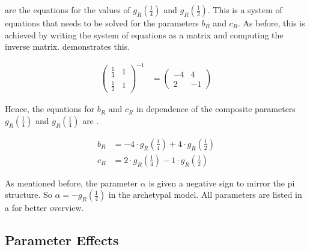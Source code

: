  are the equations for the values of $g_R\left(\frac{1}{4}\right)$ and $g_R\left(\frac{1}{2}\right)$.
This is a system of equations that needs to be solved for the parameters $b_R$ and $c_R$.
As before, this is achieved by writing the system of equations as a matrix and computing the inverse matrix.
 demonstrates this.

\begin{align}
	\begin{pmatrix}
		\frac{1}{4} & 1 \\
		\frac{1}{2} & 1
	\end{pmatrix}^{-1} & =
	\begin{pmatrix}
		-4 & 4  \\
		2  & -1
	\end{pmatrix}
	\label{equ:setup.arch.matrix}
\end{align}

Hence, the equations for $b_R$ and $c_R$ in dependence of the composite parameters $g_R\left(\frac{1}{4}\right)$ and $g_R\left(\frac{1}{4}\right)$ are .

\begin{align}
	b_R & = -4 \cdot g_R\left(\frac{1}{4}\right) + 4 \cdot g_R\left(\frac{1}{2}\right) \label{equ:setup.arch.bR} \\
	c_R & = 2 \cdot g_R\left(\frac{1}{4}\right) - 1 \cdot g_R\left(\frac{1}{2}\right) \label{equ:setup.arch.cR}
\end{align}



As mentioned before, the parameter $\alpha$ is given a negative sign to mirror the \gls{pi} structure.
So $\alpha = -g_R\left(\frac{1}{4}\right)$ in the archetypal model.
All parameters are listed in  a for better overview.

\clearpage
\subsection{Parameter Effects}
\label{sec:setup.arch.parameterfx}


